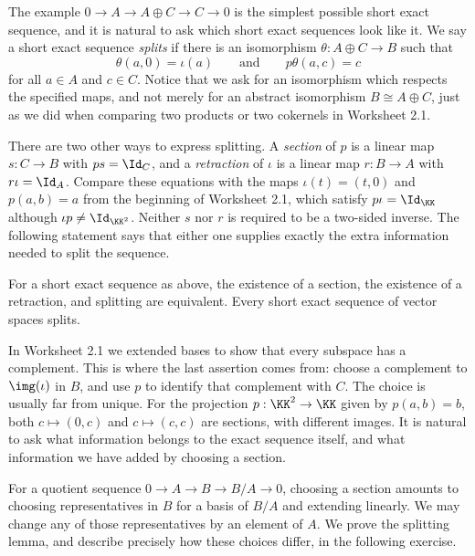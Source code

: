 \documentclass[12pt,reqno]{amsart}
\begin{document}
The example $0\to A\to A\oplus C\to C\to0$ is the simplest possible short exact sequence, and it is natural to ask which short exact sequences look like it. We say a short exact sequence \emph{splits} if there is an isomorphism $\theta:A\oplus C\to B$ such that
\[
\theta(a,0)=\iota(a)\qquad\text{and}\qquad p\theta(a,c)=c
\]
for all $a\in A$ and $c\in C$. Notice that we ask for an isomorphism which respects the specified maps, and not merely for an abstract isomorphism $B\cong A\oplus C$, just as we did when comparing two products or two cokernels in Worksheet 2.1.

There are two other ways to express splitting. A \emph{section} of $p$ is a linear map $s:C\to B$ with $ps=\Id_C$, and a \emph{retraction} of $\iota$ is a linear map $r:B\to A$ with $r\iota=\Id_A$. Compare these equations with the maps $\iota(t)=(t,0)$ and $p(a,b)=a$ from the beginning of Worksheet 2.1, which satisfy $p\iota=\Id_{\KK}$ although $\iota p\neq\Id_{\KK^2}$. Neither $s$ nor $r$ is required to be a two-sided inverse. The following statement says that either one supplies exactly the extra information needed to split the sequence.

\begin{theorem}
For a short exact sequence as above, the existence of a section, the existence of a retraction, and splitting are equivalent. Every short exact sequence of vector spaces splits.
\end{theorem}

In Worksheet 2.1 we extended bases to show that every subspace has a complement. This is where the last assertion comes from: choose a complement to $\img(\iota)$ in $B$, and use $p$ to identify that complement with $C$. The choice is usually far from unique. For the projection $p:\KK^2\to\KK$ given by $p(a,b)=b$, both $c\mapsto(0,c)$ and $c\mapsto(c,c)$ are sections, with different images. It is natural to ask what information belongs to the exact sequence itself, and what information we have added by choosing a section.

For a quotient sequence $0\to A\to B\to B/A\to0$, choosing a section amounts to choosing representatives in $B$ for a basis of $B/A$ and extending linearly. We may change any of those representatives by an element of $A$. We prove the splitting lemma, and describe precisely how these choices differ, in the following exercise.

\hrulefill
\end{document}
